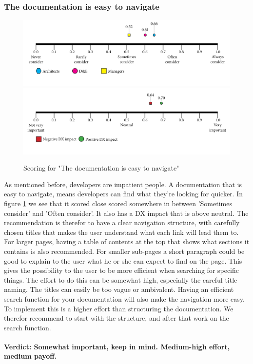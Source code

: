 \documentclass{article}
\begin{document}
\subsubsection{The documentation is easy to navigate}
\begin{figure}[H]
\centering
\includegraphics[width=\linewidth]{scorelines/aspect7.png}
\includegraphics[width=\linewidth]{dxscorelines/dxaspect7.png}
\caption{Scoring for "The documentation is easy to navigate"}
\label{fig:aspect7}
\end{figure}
As mentioned before, developers are impatient people. A documentation that is easy to navigate, means developers can find what they're looking for quicker. In figure \ref{fig:aspect7} we see that it scored close scored somewhere in between 'Sometimes consider' and 'Often consider'. It also has a DX impact that is above neutral. The recommendation is therefor to have a clear navigation structure, with carefully chosen titles that makes the user understand what each link will lead them to. For larger pages, having a table of contents at the top that shows what sections it contains is also recommended. For smaller sub-pages a short paragraph could be good to explain to the user what he or she can expect to find on the page. This gives the possibility to the user to be more efficient when searching for specific things. The effort to do this can be somewhat high, especially the careful title naming. The titles can easily be too vague or ambivalent. Having an efficient search function for your documentation will also make the navigation more easy. To implement this is a higher effort than structuring the documentation. We therefor recommend to start with the structure, and after that work on the search function. \\ \\
\textbf{Verdict: Somewhat important, keep in mind. Medium-high effort, medium payoff.}
\end{document}
